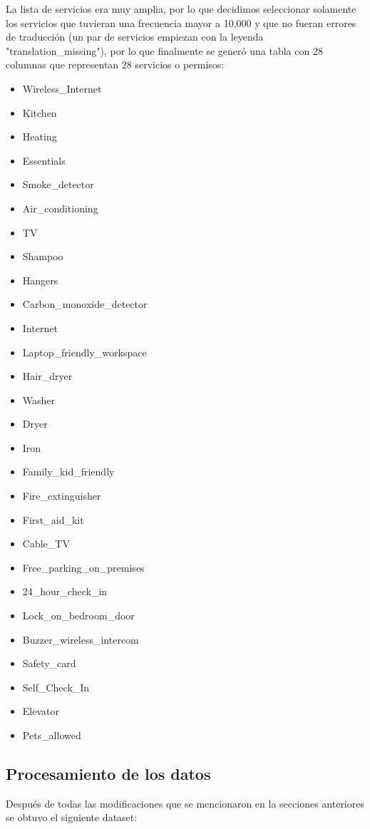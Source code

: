 \documentclass[sigconf,authorversion,nonacm]{acmart}
\begin{document}
La lista de servicios era muy amplia, por lo que decidimos seleccionar solamente los servicios que tuvieran una frecuencia mayor a 10,000 y que no fueran errores de traducción (un par de servicios empiezan con la leyenda "translation\_missing"), por lo que finalmente se generó una tabla con 28 columnas que representan 28 servicios o permisos:
\begin{itemize}
  \item Wireless\_Internet
  \item Kitchen
  \item Heating
  \item Essentials
  \item Smoke\_detector
  \item Air\_conditioning
  \item TV
  \item Shampoo
  \item Hangers
  \item Carbon\_monoxide\_detector
  \item Internet
  \item Laptop\_friendly\_workspace
  \item Hair\_dryer
  \item Washer
  \item Dryer
  \item Iron
  \item Family\_kid\_friendly
  \item Fire\_extinguisher
  \item First\_aid\_kit
  \item Cable\_TV
  \item Free\_parking\_on\_premises
  \item 24\_hour\_check\_in
  \item Lock\_on\_bedroom\_door
  \item Buzzer\_wireless\_intercom
  \item Safety\_card
  \item Self\_Check\_In
  \item Elevator
  \item Pets\_allowed
\end{itemize}


\subsection{Procesamiento de los datos}
Después de todas las modificaciones que se mencionaron en la secciones anteriores se obtuvo el siguiente dataset: 
\end{document}
